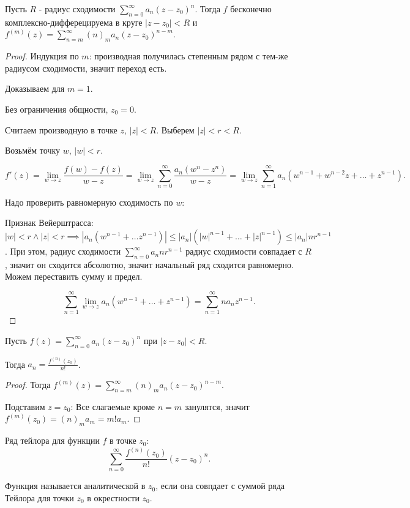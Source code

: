 \begin{theorem} \thmslashn

    Пусть $R$ - радиус сходимости $\sum\limits_{n=0}^{\infty} a_{n}(z-z_0)^{n}$. Тогда $f$ бесконечно комплексно-дифферецируема в круге $|z-z_0| < R$ и $f^{(m)}(z) = \sum\limits_{n=m}^{\infty} (n)_{m} a_{n} (z-z_0)^{n-m}$.
    \begin{proof} \thmslashn
    
        Индукция по $m$: производная получилась степенным рядом с тем-же радиусом сходимости, значит переход есть.

        Доказываем для $m=1$.

        Без ограничения общности, $z_0=0$.

        Считаем производную в точке $z$, $|z| < R$. Выберем $|z| < r < R$.

        Возьмём точку $w$, $|w| < r$.

        \[ f'(z) = \lim\limits_{w \to z} \frac{f(w) - f(z)}{w-z} = \lim\limits_{w \to z} \sum\limits_{n=0}^{\infty} \frac{a_{n}\left( w^{n}-z^{n} \right) }{w-z} = \lim\limits_{w \to z} \sum\limits_{n=1}^{\infty} a_{n}(w^{n-1}+w^{n-2}z + \ldots + z^{n-1}) .\]

        Надо проверить равномерную сходимость по $w$:

        Признак Вейерштрасса: $|w| < r \land |z| < r \implies |a_{n}(w^{n-1} + \ldots z^{n-1})| \le |a_{n}|(|w|^{n-1} + \ldots + |z|^{n-1}) \le |a_{n}|nr^{n-1}$. При этом, радиус сходимости $\sum\limits_{n=0}^{\infty} a_{n} n r^{n-1}$ радиус сходимости совпадает с $R$, значит он сходится абсолютно, значит начальный ряд сходится равномерно. Можем переставить сумму и предел.

        \[ \sum\limits_{n=1}^{\infty} \lim\limits_{w \to z} a_{n}(w^{n-1} + \ldots + z^{n-1}) = \sum\limits_{n=1}^{\infty} na_{n}z^{n-1} .\] 
    \end{proof}
\end{theorem}
\begin{theorem} \thmslashn

    Пусть $f(z) = \sum\limits_{n=0}^{\infty} a_{n}(z-z_0)^{n}$ при $|z-z_0| < R$.

    Тогда $a_{n} = \frac{f^{(n)}(z_0)}{n!}$.
    \begin{proof} \thmslashn
    
       Тогда $f^{(m)}(z) = \sum\limits_{n=m}^{\infty} (n)_{m}a_{n}(z-z_0)^{n-m}$.

       Подставим $z=z_0$: Все слагаемые кроме $n=m$ занулятся, значит $f^{(m)}(z_0) = (n)_{m}a_{m} = m!a_{m}$.
    \end{proof}
\end{theorem}
\begin{definition} \thmslashn 

    Ряд тейлора для функции $f$ в точке $z_0$:
    \[ \sum\limits_{n=0}^{\infty} \frac{f^{(n)}(z_0)}{n!}(z-z_0)^{n} .\] 
\end{definition}
\begin{definition} \thmslashn 

    Функция называется аналитической в $z_0$, если она совпдает с суммой ряда Тейлора для точки $z_0$ в окрестности $z_0$.
\end{definition}
